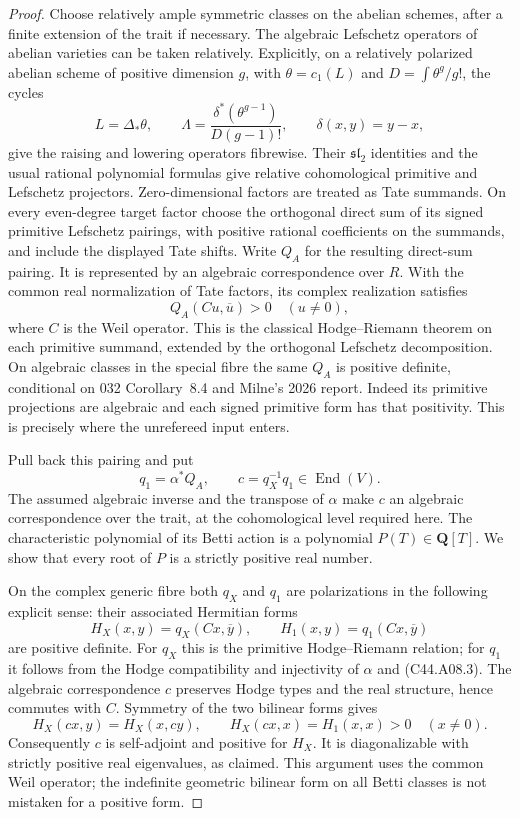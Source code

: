 \documentclass[11pt]{article}
\theoremstyle{remark}\newtheorem{remark}[theorem]{Remark}
\begin{document}
\begin{proof}
Choose relatively ample symmetric classes on the abelian schemes,
after a finite extension of the trait if necessary. The algebraic
Lefschetz operators of abelian varieties can be taken relatively.
Explicitly, on a relatively polarized abelian scheme of positive
dimension $g$, with $\theta=c_1(L)$ and $D=\int\theta^g/g!$, the cycles
\[
 L=\Delta_*\theta,\qquad
 \Lambda=\frac{\delta^*(\theta^{g-1})}{D(g-1)!},
 \qquad \delta(x,y)=y-x,
\]
give the raising and lowering operators fibrewise. Their
$\mathfrak{sl}_2$ identities and the usual rational polynomial
formulas give relative cohomological primitive and Lefschetz
projectors. Zero-dimensional factors are treated as Tate summands.
On every even-degree target factor choose the
orthogonal direct sum of its signed primitive Lefschetz pairings,
with positive rational coefficients on the summands, and include
the displayed Tate shifts. Write $Q_A$ for the resulting direct-sum
pairing. It is represented by an algebraic correspondence over
$R$. With the common real normalization of Tate factors, its
complex realization satisfies
\[
                  Q_A(Cu,\overline u)>0\quad(u\ne0),
 \tag{C44.A08.3}
\]
where $C$ is the Weil operator. This is the classical
Hodge--Riemann theorem on each primitive summand, extended by the
orthogonal Lefschetz decomposition. On algebraic classes in the
special fibre the same $Q_A$ is positive definite, conditional
on 032 Corollary~8.4 and Milne's 2026 report. Indeed its primitive
projections are algebraic and each signed primitive form has
that positivity. This is precisely where the unrefereed input
enters.

Pull back this pairing and put
\[
                  q_1=\alpha^*Q_A,\qquad
                  c=q_X^{-1}q_1\in\operatorname{End}(V).
 \tag{C44.A08.4}
\]
The assumed algebraic inverse and the transpose of $\alpha$
make $c$ an algebraic correspondence over the trait, at the
cohomological level required here. The characteristic polynomial
of its Betti action is a polynomial $P(T)\in\mathbf Q[T]$.
We show that every root of $P$ is a strictly positive real number.

On the complex generic fibre both $q_X$ and $q_1$ are
polarizations in the following explicit sense: their associated
Hermitian forms
\[
 H_X(x,y)=q_X(Cx,\overline y),\qquad
 H_1(x,y)=q_1(Cx,\overline y)
\]
are positive definite. For $q_X$ this is the primitive
Hodge--Riemann relation; for $q_1$ it follows from the Hodge
compatibility and injectivity of $\alpha$ and (C44.A08.3).
The algebraic correspondence $c$ preserves Hodge types and the
real structure, hence commutes with $C$. Symmetry of the two
bilinear forms gives
\[
 H_X(cx,y)=H_X(x,cy),\qquad H_X(cx,x)=H_1(x,x)>0
 \quad(x\ne0).
\]
Consequently $c$ is self-adjoint and positive for $H_X$.
It is diagonalizable with strictly positive real eigenvalues,
as claimed. This argument uses the common Weil operator; the
indefinite geometric bilinear form on all Betti classes is not
mistaken for a positive form.


\end{proof}
\end{document}

